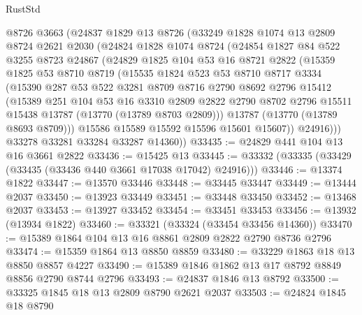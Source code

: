 \begin{lexlean}{RustStd}
\begin{coremodule}
    @8726
    @3663
    (@24837
      @1829
      @13
      @8726
      (@33249
        @1828
        @1074
        @13
        @2809
        @8724
        @2621
        @2030
        (@24824
          @1828
          @1074
          @8724
          (@24854
            @1827
            @84
            @522
            @3255
            @8723
            @24867
            (@24829
              @1825
              @104
              @53
              @16
              @8721
              @2822
              (@15359
                @1825
                @53
                @8710
                @8719
                (@15535
                  @1824
                  @523
                  @53
                  @8710
                  @8717
                  @3334
                  (@15390
                    @287
                    @53
                    @522
                    @3281
                    @8709
                    @8716
                    @2790
                    @8692
                    @2796
                    @15412
                    (@15389
                      @251
                      @104
                      @53
                      @16
                      @3310
                      @2809
                      @2822
                      @2790
                      @8702
                      @2796
                      @15511
                      @15438
                      @13787
                      (@13770 (@13789 @8703 @2809)))
                    @13787
                    (@13770 (@13789 @8693 @8709)))
                  @15586
                  @15589
                  @15592
                  @15596
                  @15601
                  @15607))
              @24916)))
        @33278
        @33281
        @33284
        @33287
        @14360))
@33435 := @24829 @441 @104 @13 @16 @3661 @2822
@33436 := @15425 @13
@33445 := @33332 (@33335 (@33429 (@33435 (@33436 @440 @3661 @17038 @17042) @24916)))
@33446 := @13374 @1822
@33447 := @13570 @33446
@33448 := @33445 @33447
@33449 := @13444 @2037
@33450 := @13923 @33449
@33451 := @33448 @33450
@33452 := @13468 @2037
@33453 := @13927 @33452
@33454 := @33451 @33453
@33456 := @13932 (@13934 @1822)
@33460 := @33321 (@33324 (@33454 @33456 @14360))
@33470 := @15389 @1864 @104 @13 @16 @8861 @2809 @2822 @2790 @8736 @2796
@33474 := @15359 @1864 @13 @8850 @8859
@33480 := @33229 @1863 @18 @13 @8850 @8857 @4227
@33490 := @15389 @1846 @1862 @13 @17 @8792 @8849 @8856 @2790 @8744 @2796
@33493 := @24837 @1846 @13 @8792
@33500 := @33325 @1845 @18 @13 @2809 @8790 @2621 @2037
@33503 := @24824 @1845 @18 @8790

\end{coremodule}
\end{lexlean}
